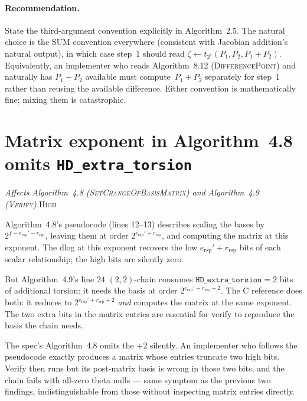 \documentclass[a4paper,11pt]{article}
\newcommand{\algo}[1]{Algorithm~#1}
\newcommand{\high}{\textsc{\color{BurntOrange}High}}
\newcommand{\finding}[2]{\noindent\textit{#1}\hfill#2\par\smallskip}
\begin{document}
\paragraph{Recommendation.}
State the third-argument convention explicitly in \algo{2.5}.
The natural choice is the SUM convention everywhere
(consistent with Jacobian addition's natural output), in which
case step~1 should read $\zeta \leftarrow t_{2^e}(P_1, P_2,
P_1{+}P_2)$.  Equivalently, an implementer who reads
\algo{8.12} (\textsc{DifferencePoint}) and naturally has
$P_1{-}P_2$ available must compute~$P_1{+}P_2$ separately for
step~1 rather than reusing the available difference.  Either
convention is mathematically fine; mixing them is catastrophic.

\section{Matrix exponent in \algo{4.8} omits \texttt{HD\_extra\_torsion}}
\label{sec:matrix-exponent}

\finding{Affects \algo{4.8} (\textsc{SetChangeOfBasisMatrix}) and
\algo{4.9} (\textsc{Verify}).}{\high}

\algo{4.8}'s pseudocode (lines 12--13) describes scaling the bases
by $2^{f - e_{\mathrm{rsp}}' - r_{\mathrm{rsp}}}$, leaving them at
order $2^{e_{\mathrm{rsp}}' + r_{\mathrm{rsp}}}$, and computing the
matrix at this exponent.  The dlog at this exponent recovers the
low $e_{\mathrm{rsp}}' + r_{\mathrm{rsp}}$ bits of each scalar
relationship; the high bits are silently zero.

But \algo{4.9}'s line 24 $(2,2)$-chain consumes
$\texttt{HD\_extra\_torsion} = 2$ bits of additional torsion: it
needs the basis at order $2^{e_{\mathrm{rsp}}' + r_{\mathrm{rsp}} + 2}$.
The C reference does both: it reduces to $2^{e_{\mathrm{rsp}}' +
r_{\mathrm{rsp}} + 2}$ \emph{and} computes the matrix at the same
exponent.  The two extra bits in the matrix entries are essential
for verify to reproduce the basis the chain needs.

The spec's \algo{4.8} omits the $+2$ silently.  An implementer who
follows the pseudocode exactly produces a matrix whose entries
truncate two high bits.  Verify then runs but its post-matrix basis
is wrong in those two bits, and the chain fails with all-zero theta
nulls — same symptom as the previous two findings, indistinguishable
from those without inspecting matrix entries directly.
\end{document}
